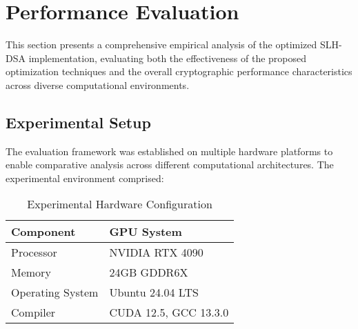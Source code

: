 \documentclass[journal]{IEEEtran}
\begin{document}



\section{Performance Evaluation}\label{sec:evaluation}

This section presents a comprehensive empirical analysis of the optimized SLH-DSA implementation, evaluating both the effectiveness of the proposed optimization techniques and the overall cryptographic performance characteristics across diverse computational environments.

\subsection{Experimental Setup}

The evaluation framework was established on multiple hardware platforms to enable comparative analysis across different computational architectures. The experimental environment comprised:

\begin{table}[h]
  \centering
  \caption{Experimental Hardware Configuration}
  \label{tab:hardware_config}
  \begin{tabular}{@{}ll@{}}
    \toprule
    \textbf{Component} & \textbf{GPU System} \\
    \midrule
    Processor & NVIDIA RTX 4090 \\
    Memory & 24GB GDDR6X \\
    Operating System & Ubuntu 24.04 LTS \\
    Compiler & CUDA 12.5, GCC 13.3.0 \\
    \bottomrule
  \end{tabular}
\end{table}
\end{document}
